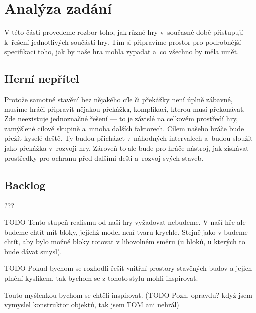
\chapter{Analýza zadání}
\label{chap:analyza}

V této části provedeme rozbor toho, jak různé hry v~současné době přistupují k~řešení jednotlivých součástí hry. Tím si připravíme prostor pro podrobnější specifikaci toho, jak by naše hra mohla vypadat a~co všechno by měla umět.









\section{Herní nepřítel}
Protože samotné stavění bez nějakého cíle či překážky není úplně zábavné, musíme hráči připravit nějakou překážku, komplikaci, kterou musí překonávat. Zde neexistuje jednoznačné řešení --- to je závislé na celkovém prostředí hry, zamýšlené cílově skupině a~mnoha dalších faktorech. Cílem našeho hráče bude přežít kyselé deště. Ty budou přicházet v~náhodných intervalech a~budou sloužit jako překážka v~rozvoji hry. Zároveň to ale bude pro hráče nástroj, jak získávat prostředky pro ochranu před dalšími dešti a~rozvoj svých staveb. 

\section{Backlog}


???




TODO Tento stupeň realismu od naší hry vyžadovat nebudeme. V naší hře ale budeme chtít mít bloky, jejichž model není tvaru krychle. Stejně jako v \SE{} budeme chtít, aby bylo možné bloky rotovat v libovolném směru (u bloků, u kterých to bude dávat smysl).

TODO Pokud bychom se rozhodli řešit vnitřní prostory stavěných budov a jejich plnění kyslíkem, tak bychom se z tohoto stylu mohli inspirovat.

Touto myšlenkou bychom se chtěli inspirovat.  (TODO Pozn. opravdu? když jsem vymyslel konstruktor objektů, tak jsem TOM ani nehrál)